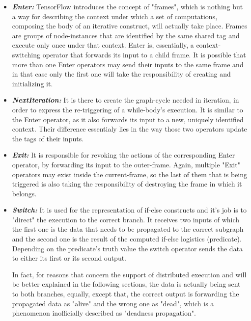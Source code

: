 \documentclass[ack,preface]{dithesis}
\begin{document}
    \begin{itemize}

    \item \textit{\textbf{Enter:}} TensorFlow introduces the concept of "frames", which is nothing but a way for describing the context under which a set of computations, composing the body of an iterative construct, will actually take place. Frames are groups of node-instances that are identified by the same shared tag and execute only once under that context. Enter is, essentially, a context-switching operator that forwards its input to a child frame. It is possible that more than one Enter operators may send their inputs to the same frame and in that case only the first one will take the responsibility of creating and initializing it.

    \item \textit{\textbf{NextIteration:}} It is there to create the graph-cycle needed in iteration, in order to express the re-triggering of a while-body's execution. It is similar to the Enter operator, as it also forwards its input to a new, uniquely identified context. Their difference essentialy lies in the way those two operators update the tags of their inputs.

    \item \textit{\textbf{Exit:}} It  is responsible for revoking the actions of the corresponding Enter operator, by forwarding its input to the outer-frame.
 Again, multiple "Exit" operators may exist inside the current-frame, so the last of them that is being triggered is also taking the responsibility of destroying the frame in which it belongs.

    \item \textit{\textbf{Switch:}} It is used for the representation of if-else constructs and it's job is to "direct" the execution to the correct branch. It receives two inputs of which the first one is the data that needs to be propagated to the correct subgraph and the second one is the result of the computed if-else logistics  (predicate). Depending on the predicate's truth value the switch operator sends the data to either its first or its second output. 

In fact, for reasons that concern the support of distributed execution and will be better explained in the following sections,  the data is actually being sent to both branches, equally, 
except that, the correct output is forwarding the propagated data as "alive" and the wrong one as "dead", which is a phenomenon inofficially described as "deadness propagation".


\end{itemize}
\end{document}
